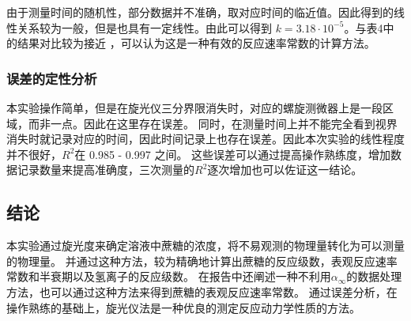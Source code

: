 \documentclass[cn,hazy,pku,12pt,normal,math=newtx,cite=super]{elegantnote}
\begin{document}
由于测量时间的随机性，部分数据并不准确，取对应时间的临近值。因此得到的线性关系较为一般，但是也具有一定线性。由此可以得到 $k = 3.18\cdot10^{-5}$。与表4中的结果对比较为接近
，可以认为这是一种有效的反应速率常数的计算方法。

\subsubsection{误差的定性分析}

本实验操作简单，但是在旋光仪三分界限消失时，对应的螺旋测微器上是一段区域，而非一点。因此在这里存在误差。
同时，在测量时间上并不能完全看到视界消失时就记录对应的时间，因此时间记录上也存在误差。因此本次实验的线性程度并不很好，$R^2$在 0.985 - 0.997 之间。
这些误差可以通过提高操作熟练度，增加数据记录数量来提高准确度，三次测量的$R^2$逐次增加也可以佐证这一结论。

\subsection{结论}

本实验通过旋光度来确定溶液中蔗糖的浓度，将不易观测的物理量转化为可以测量的物理量。
并通过这种方法，较为精确地计算出蔗糖的反应级数，表观反应速率常数和半衰期以及氢离子的反应级数。
在报告中还阐述一种不利用$\alpha_\infty$的数据处理方法，也可以通过这种方法来得到蔗糖的表观反应速率常数。
通过误差分析，在操作熟练的基础上，旋光仪法是一种优良的测定反应动力学性质的方法。



\nocite{*}

\end{document}
